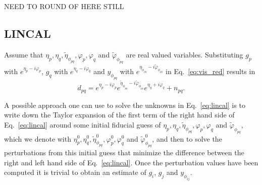 \documentclass[useAMS,usenatbib]{mn2e}
\begin{document}
NEED TO ROUND OF HERE STILL 

\subsection{LINCAL}
Assume that $\eta_p,\eta_q,\widetilde{\eta}_{\phi_{pq}},\varphi_p,\varphi_q$ and $\widetilde{\varphi}_{\phi_{pq}}$ are real valued variables.
Substituting $g_p$ with $e^{\eta_p - i \varphi_p}$, $g_q$ with $e^{\eta_q - i \varphi_q}$ and $y_{\phi_{pq}}$ with $e^{\eta_{\widetilde{\phi}_{pq}}- i \widetilde{\varphi}_{\phi_{pq}}}$ in Eq.~\eqref{eq:vis_red} results in  
\begin{equation}
\label{eq:lincal}
d_{pq} =  e^{\eta_p - i \varphi_p} e^{\widetilde{\eta}_{\phi_{pq}}- i \widetilde{\varphi}_{\phi_{pq}}} e^{\eta_q + i \varphi_q} + n_{pq}.
\end{equation}

A possible approach one can use to solve the unknowns in Eq.~\eqref{eq:lincal} is to write down the Taylor expansion of the first term of the right hand side of Eq.~\eqref{eq:lincal} around some 
initial fiducial guess of $\eta_p,\eta_q,\widetilde{\eta}_{\phi_{pq}},\varphi_p,\varphi_q$ and $\widetilde{\varphi}_{\phi_{pq}}$, which we denote with 
$\eta_p^0,\eta_q^0,\widetilde{\eta}_{\phi_{pq}}^0,\varphi_p^0,\varphi_q^0$ and $\widetilde{\varphi}_{\phi_{pq}}^0$, and then to solve the perturbations from this 
initial guess that minimize the difference between the right and left hand side of Eq.~\eqref{eq:lincal}. Once the perturbation values 
have been computed it is trivial to obtain an estimate of $g_i$, $g_j$ and $y_{\phi_{ij}}$. 
\end{document}
